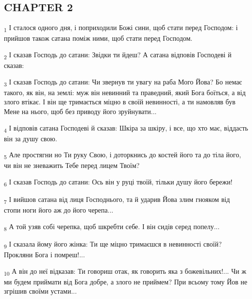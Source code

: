 \subsection{CHAPTER 2}
\begin{tcolorbox}
\textsubscript{1} І сталося одного дня, і поприходили Божі сини, щоб стати перед Господом: і прийшов також сатана поміж ними, щоб стати перед Господом.
\end{tcolorbox}
\begin{tcolorbox}
\textsubscript{2} І сказав Господь до сатани: Звідки ти йдеш? А сатана відповів Господеві й сказав:
\end{tcolorbox}
\begin{tcolorbox}
\textsubscript{3} І сказав Господь до сатани: Чи звернув ти увагу на раба Мого Йова? Бо немає такого, як він, на землі: муж він невинний та праведний, який Бога боїться, а від злого втікає. І він ще тримається міцно в своїй невинності, а ти намовляв був Мене на нього, щоб без приводу його зруйнувати...
\end{tcolorbox}
\begin{tcolorbox}
\textsubscript{4} І відповів сатана Господеві й сказав: Шкіра за шкіру, і все, що хто має, віддасть він за душу свою.
\end{tcolorbox}
\begin{tcolorbox}
\textsubscript{5} Але простягни но Ти руку Свою, і доторкнись до костей його та до тіла його, чи він не зневажить Тебе перед лицем Твоїм?
\end{tcolorbox}
\begin{tcolorbox}
\textsubscript{6} І сказав Господь до сатани: Ось він у руці твоїй, тільки душу його бережи!
\end{tcolorbox}
\begin{tcolorbox}
\textsubscript{7} І вийшов сатана від лиця Господнього, та й ударив Йова злим гнояком від стопи ноги його аж до його черепа...
\end{tcolorbox}
\begin{tcolorbox}
\textsubscript{8} А той узяв собі черепка, щоб шкребти себе. І він сидів серед попелу...
\end{tcolorbox}
\begin{tcolorbox}
\textsubscript{9} І сказала йому його жінка: Ти ще міцно тримаєшся в невинності своїй? Прокляни Бога і помреш!...
\end{tcolorbox}
\begin{tcolorbox}
\textsubscript{10} А він до неї відказав: Ти говориш отак, як говорить яка з божевільних!... Чи ж ми будем приймати від Бога добре, а злого не приймем? При всьому тому Йов не згрішив своїми устами...
\end{tcolorbox}
